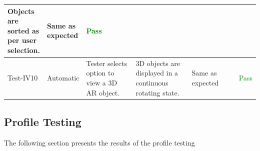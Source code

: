 \documentclass[12pt, titlepage]{article}
\begin{document}
\begin{table}[H]
{\begin{tabular}{|l|p{0.15\linewidth}|p{0.3\linewidth}|p{0.3\linewidth}|p{0.3\linewidth}|p{0.1\linewidth}|}
      Objects are sorted as per user selection.                                &
      Same as expected                                                         &
      \textcolor{Green}{Pass}                                                    \\
      \hline
      Test-IV10                                                                &
      Automatic                                                                &
      Tester selects option to view a 3D AR object.                            &
      3D objects are displayed in a continuous rotating state.                 &
      Same as expected                                                         &
      \textcolor{Green}{Pass}                                                    \\
      \hline
    \end{tabular}}
  \label{table:Inventory_Tests}
\end{table}
\subsection{Profile Testing}
The following section presents the results of the profile testing
\end{document}
